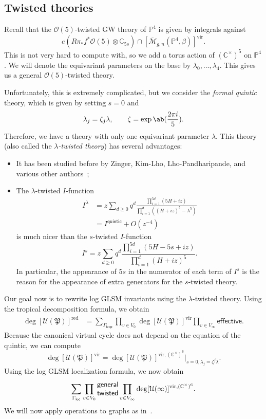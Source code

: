 \documentclass[10pt]{amsart}
\theoremstyle{definition}
\theoremstyle{remark}
\theoremstyle{plain}
\theoremstyle{definition}
\theoremstyle{remark}
\newcommand{\C}{\mathbb{C}}
\renewcommand{\P}{\mathbb{P}}
\newcommand{\Mbar}{\overline{\mathcal{M}}}
\newcommand{\mc}[1]{\mathcal{#1}}
\newcommand{\mf}[1]{\mathfrak{#1}}
\newcommand{\mr}[1]{\mathrm{#1}}
\newcommand{\ms}[1]{\mathsf{#1}}
\newcommand{\1}{\mathbf{1}}
\newcommand{\2}{\mathbf{2}}
\newcommand{\3}{\mathbf{3}}
\newcommand{\vir}{\mr{vir}}
\newcommand{\red}{\mr{red}}
\begin{document}
\subsection{Twisted theories}%
\label{sub:Twisted theory}

Recall that the $\mc{O}(5)$-twisted GW theory of $\P^4$ is given by integrals against
\[ e(R\pi_* f^* \mc{O}(5) \otimes \C_{5s}) \cap [\Mbar_{g,n}(\P^4, \beta)]^{\vir}. \]
This is not very hard to compute with, so we add a torus action of $(\C^{\times})^5$ on $\P^4$. We will denote the equivariant parameters on the base by $\lambda_0, \ldots, \lambda_4$. This gives us a general $\mc{O}(5)$-twisted theory.

Unfortunately, this is extremely complicated, but we consider the \textit{formal quintic} theory, which is given by setting $s=0$ and
\[ \lambda_j = \zeta_j \lambda, \qquad \zeta = \exp\ab(\frac{2\pi i}{5}). \]
Therefore, we have a theory with only one equivariant parameter $\lambda$. This theory (also called the \textit{$\lambda$-twisted theory}) has several advantages:
\begin{itemize}
    \item It has been studied before by Zinger, Kim-Lho, Lho-Pandharipande, and various other authors~\cite{reducedgenus1,kimlho,sqhae};
    \item The $\lambda$-twisted $I$-function
        \begin{align*}
            I^{\lambda}&=  z \sum_{d \geq 0} q^d \frac{\prod_{i=1}^{5d} (5H+iz)}{\prod_{i=1}^d ((H+iz)^5 - \lambda^5)} \\
            &= I^{\ms{quintic}} + O(z^{-4})
        \end{align*}
        is much nicer than the $s$-twisted $I$-function
        \[ I^{s}=  z \sum_{d \geq 0} q^d \frac{\prod_{i=1}^{5d} (5H - 5s+iz)}{\prod_{i=1}^d (H+iz)^5}. \]
        In particular, the appearance of $5s$ in the numerator of each term of $I^s$ is the reason for the appearance of extra generators for the $s$-twisted theory.
\end{itemize}

Our goal now is to rewrite log GLSM invariants using the $\lambda$-twisted theory. Using the tropical decomposition formula, we obtain
\begin{align*}
    \deg [\mc{U}(\mf{P})]^{\red} &= \sum_{\Gamma_{\ms{trop}}} \prod_{v \in V_0} \deg [\mc{U}(\mf{P})]^{\vir} \prod_{v \in V_{\infty}} \ms{effective}.
\end{align*}
Because the canonical virtual cycle does not depend on the equation of the quintic, we can compute
\[ \deg [\mc{U}(\mf{P})]^{\vir} = \deg [\mc{U}(\mf{P})]^{\vir, (\C^{\times})^6} |_{s=0,\lambda_j = \zeta^j \lambda}. \]
Using the log GLSM localization formula, we now obtain
\[ \sum_{\Gamma_{\ms{loc}}} \prod_{v \in V_0} \Centerstack{\textsf{general} \textsf{twisted}} \prod_{v \in V_{\infty}} \deg [\mc{U}(\infty)]^{\vir, (\C^{\times})^6}. \]
We will now apply operations to graphs as in~.
\end{document}
